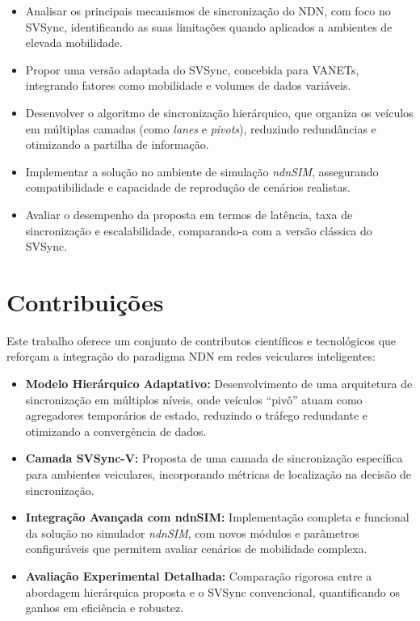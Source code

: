 \begin{itemize}
    \item Analisar os principais mecanismos de sincronização do \gls{NDN}, com foco no \gls{SVSync}, identificando as suas limitações quando aplicados a ambientes de elevada mobilidade.
    \item Propor uma versão adaptada do \gls{SVSync}, concebida para \gls{VANETs}, integrando fatores como mobilidade e volumes de dados variáveis.
    \item Desenvolver o algoritmo de sincronização hierárquico, que organiza os veículos em múltiplas camadas (como \textit{lanes} e \textit{pivots}), reduzindo redundâncias e otimizando a partilha de informação.
    \item Implementar a solução no ambiente de simulação \textit{ndnSIM}, assegurando compatibilidade e capacidade de reprodução de cenários realistas.
    \item Avaliar o desempenho da proposta em termos de latência, taxa de sincronização e escalabilidade, comparando-a com a versão clássica do \gls{SVSync}.
\end{itemize}

\section{Contribuições}
\label{sec:contribuicoes}

Este trabalho oferece um conjunto de contributos científicos e tecnológicos que reforçam a integração do paradigma \gls{NDN} em redes veiculares inteligentes:

\begin{itemize}
    \item \textbf{Modelo Hierárquico Adaptativo:} Desenvolvimento de uma arquitetura de sincronização em múltiplos níveis, onde veículos “pivô” atuam como agregadores temporários de estado, reduzindo o tráfego redundante e otimizando a convergência de dados.
    \item \textbf{Camada SVSync-V:} Proposta de uma camada de sincronização específica para ambientes veiculares, incorporando métricas de localização na decisão de sincronização.
    \item \textbf{Integração Avançada com ndnSIM:} Implementação completa e funcional da solução no simulador \textit{ndnSIM}, com novos módulos e parâmetros configuráveis que permitem avaliar cenários de mobilidade complexa.
    \item \textbf{Avaliação Experimental Detalhada:} Comparação rigorosa entre a abordagem hierárquica proposta e o \gls{SVSync} convencional, quantificando os ganhos em eficiência e robustez.
\end{itemize}

